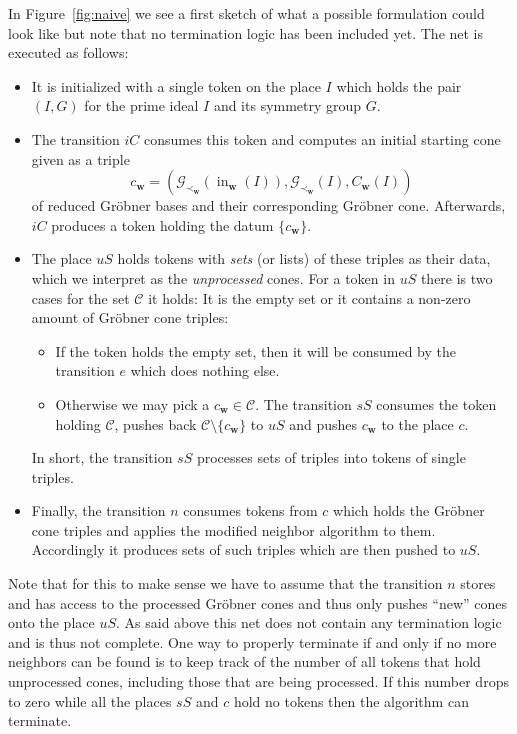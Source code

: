 \documentclass[
  paper=a4,
  titlepage,
  bibliography=totoc,
  listof=totoc,
  pagesize=pdftex
]{scrartcl}
\numberwithin{figure}{section}
\numberwithin{equation}{section}
\numberwithin{table}{section}
\let\vec\mathbf
\DeclareMathOperator{\initial}{in}
\theoremstyle{definition}
\numberwithin{definition}{section}
\begin{document}
In Figure~\ref{fig:naive} we see a first sketch of what a possible formulation could look
like but note that no termination logic has been included yet. The net is executed as
follows:
\begin{itemize}
  \item It is initialized with a single token on the place $I$ which holds the pair $(I,
    G)$ for the prime ideal $I$ and its symmetry group $G$.
  \item The transition $iC$ consumes this token and computes an initial starting cone
    given as a triple
    \[
      c_{\vec w} = (
        \mathcal G_{\prec_{\vec w}}(\initial_{\vec w}(I)),
        \mathcal G_{\prec_{\vec w}}(I),
        C_{\vec w}(I)
      )
    \]
    of reduced Gröbner bases and their corresponding Gröbner cone. Afterwards, $iC$
    produces a token holding the datum $\{c_{\vec w}\}$.
  \item The place $uS$ holds tokens with \emph{sets} (or lists) of these triples as their
    data, which we interpret as the \emph{unprocessed} cones. For a token in $uS$ there is
    two cases for the set $\mathcal C$ it holds: It is the empty set or it contains a
    non-zero amount of Gröbner cone triples:
    \begin{itemize}
      \item If the token holds the empty set, then it will be consumed by the transition
        $e$ which does nothing else.
      \item Otherwise we may pick a $c_{\vec w} \in \mathcal C$. The transition $sS$
        consumes the token holding $\mathcal C$, pushes back $\mathcal C\setminus \{
        c_{\vec w}\}$ to $uS$ and pushes $c_{\vec w}$ to the place $c$.
    \end{itemize}
    In short, the transition $sS$ processes sets of triples into tokens of single triples.
  \item Finally, the transition $n$ consumes tokens from $c$ which holds the Gröbner cone
    triples and applies the modified neighbor algorithm to them. Accordingly it produces
    sets of such triples which are then pushed to $uS$.
\end{itemize}
Note that for this to make sense we have to assume that the transition $n$ stores and has
access to the processed Gröbner cones and thus only pushes \enquote{new} cones onto the
place $uS$. As said above this net does not contain any termination logic and is thus not
complete. One way to properly terminate if and only if no more neighbors can be found is
to keep track of the number of all tokens that hold unprocessed cones, including those
that are being processed. If this number drops to zero while all the places $sS$ and $c$
hold no tokens then the algorithm can terminate.
\end{document}
